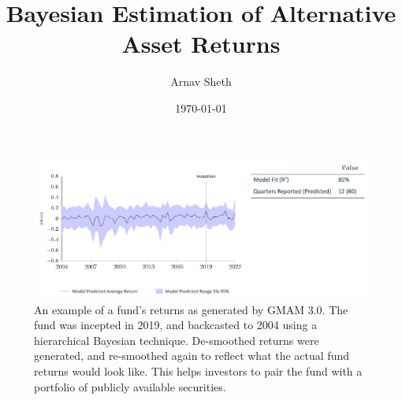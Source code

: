 \documentclass[11pt]{article}
\begin{document}
\title{Bayesian Estimation of Alternative Asset Returns}
\author{Arnav Sheth}
\date{\today}


\maketitle

\tableofcontents

\begin{figure}[!ht]
	\centering
	\includegraphics[width=475pt]{results.pdf}
	\caption{An example of a fund’s returns as generated by GMAM 3.0. The fund was incepted in 2019, and backcasted to 2004 using a hierarchical Bayesian technique. De-smoothed returns were generated, and re-smoothed again to reflect what the actual fund returns would look like. This helps investors to pair the fund with a portfolio of publicly available securities.}
\end{figure}


\end{document}
